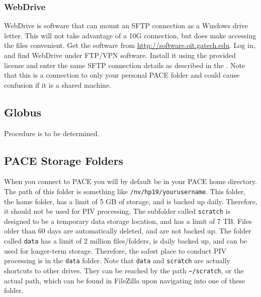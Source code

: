 \documentclass{article}
\begin{document}
	\subsubsection{WebDrive}
	\label{webdrive}
	WebDrive is software that can mount an SFTP connection as a Windows drive letter.  This will not take advantage of a 10G connection, but does make accessing the files convenient.  Get the software from \url{http://software.oit.gatech.edu}.  Log in, and find WebDrive under FTP/VPN software.  Install it using the provided license and enter the same SFTP connection details as described in the .  Note that this is a connection to only your personal PACE folder and could cause confusion if it is a shared machine.
	
	\subsection{Globus}
	Procedure is to be determined.
	
	\subsection{PACE Storage Folders}
	When you connect to PACE you will by default be in your PACE home directory.  The path of this folder is something like \nolinkurl{/nv/hp19/yourusername}.  This folder, the home folder, has a limit of 5 GB of storage, and is backed up daily.  Therefore, it should not be used for PIV processing.  The subfolder called \nolinkurl{scratch} is designed to be a temporary data storage location, and has a limit of 7 TB.  Files older than 60 days are automatically deleted, and are not backed up.  The folder called \nolinkurl{data} has a limit of 2 million files/folders, is daily backed up, and can be used for longer-term storage.  Therefore, the safest place to conduct PIV processing is in the \nolinkurl{data} folder.  Note that \nolinkurl{data} and \nolinkurl{scratch} are actually shortcuts to other drives.  They can be reached by the path \nolinkurl{~/scratch}, or the actual path, which can be found in FileZilla upon navigating into one of these folder.	
	
\end{document}
